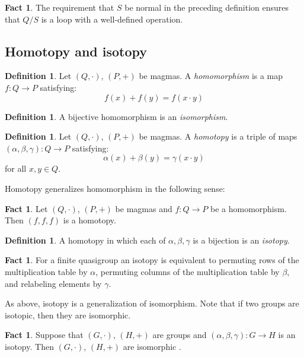 \documentclass[12pt]{report}
\theoremstyle{definition}
\newtheorem{fct}[thm]{Fact}
\newtheorem{dfn}[thm]{Definition}
\begin{document}
\begin{fct}
  The requirement that $S$ be normal in the preceding definition ensures that $Q/S$ is a loop with a well-defined operation.
\end{fct}

\subsection{Homotopy and isotopy}

\begin{dfn}
  Let $(Q, \cdot)$, $(P, +)$ be magmas. A \emph{homomorphism} is a map $f: Q\to P$ satisfying:
  \[f(x) + f(y) = f(x\cdot y)\]
\end{dfn}

\begin{dfn}
  A bijective homomorphism is an \emph{isomorphism}.
\end{dfn}

\begin{dfn}
  Let $(Q, \cdot)$, $(P, +)$ be magmas. A \emph{homotopy} is a triple of maps $(\alpha, \beta, \gamma): Q\to P$ satisfying: 
  \[\alpha(x) + \beta(y) = \gamma(x\cdot y)\]
  for all $x, y\in Q$.
\end{dfn}

Homotopy generalizes homomorphism in the following sense:

\begin{fct}
Let $(Q, \cdot)$, $(P, +)$ be magmas and $f: Q\to P$ be a homomorphism. Then $(f, f, f)$ is a homotopy.
\end{fct}

\begin{dfn}
  A homotopy in which each of $\alpha, \beta, \gamma$ is a bijection is an \emph{isotopy}.
\end{dfn}

\begin{fct}
  For a finite quasigroup an isotopy is equivalent to permuting rows of the multiplication table by $\alpha$,
    permuting columns of the multiplication table by $\beta$, and relabeling elements by $\gamma$.
\end{fct}

As above, isotopy is a generalization of isomorphism. Note that if two groups are isotopic, then they are isomorphic.

\begin{fct}
  Suppose that $(G, \cdot)$, $(H, +)$ are groups and $(\alpha, \beta, \gamma): G\to H$ is an isotopy. Then $(G, \cdot)$,
    $(H, +)$ are isomorphic \cite{Bruck}.
\end{fct}
\end{document}
